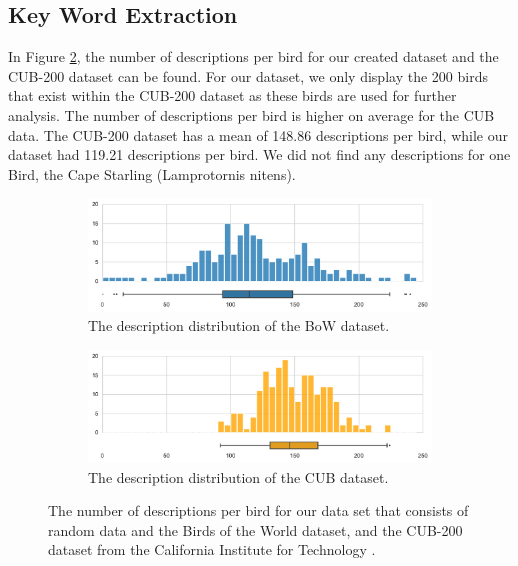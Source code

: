\documentclass[a4paper, 12pt, oneside]{book} %
\begin{document}
\subsection{Key Word Extraction} \label{par:results_keywords}
In Figure \ref{fig:CUB_distribution}, the number of descriptions per bird for our created dataset and the CUB-200 dataset can be found.
For our dataset, we only display the 200 birds that exist within the CUB-200 dataset as these birds are used for further analysis.
The number of descriptions per bird is higher on average for the CUB data.
The CUB-200 dataset has a mean of 148.86 descriptions per bird, while our dataset had 119.21 descriptions per bird.
We did not find any descriptions for one Bird, the Cape Starling (Lamprotornis nitens).
\begin{figure} [htpb]
     \centering
     \begin{subfigure}[b]{1\textwidth}
         \centering
         \includegraphics[width=\textwidth]{figures/CUB_distribution_BOW.pdf}
         \caption{The description distribution of the BoW dataset.}
         \label{fig:BOW_distribution}
     \end{subfigure}
     \vfill
     \begin{subfigure}[b]{1\textwidth}
         \centering
         \includegraphics[width=\textwidth]{figures/CUB_distribution_CUB.pdf}
         \caption{The description distribution of the CUB dataset.}
         \label{fig:CUB_distribution}
     \end{subfigure}
     \caption[Bird description distribution]{The number of descriptions per bird for our data set that consists of random data and the Birds of the World dataset, and the CUB-200 dataset from the California Institute for Technology \autocite{welinder_caltech-ucsd_2010}. }
 \label{fig:CUBBOW_distribution}
\end{figure}
\end{document}
